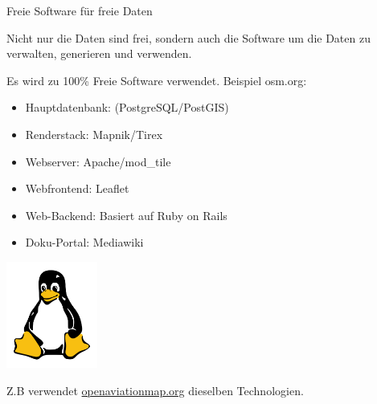 \documentclass[handout]{beamer}
\begin{document}

\begin{frame}{Freie Software für freie Daten}

Nicht nur die Daten sind frei, sondern auch die Software um die Daten zu verwalten, generieren und verwenden.

\vspace{0.6cm}

Es wird zu 100\% Freie Software verwendet. Beispiel osm.org:
\begin{itemize}
  \item Hauptdatenbank: (PostgreSQL/PostGIS) 
  \item Renderstack: Mapnik/Tirex
  \item Webserver: Apache/mod\_tile
  \item Webfrontend: Leaflet
  \item Web-Backend: Basiert auf Ruby on Rails
  \item Doku-Portal: Mediawiki
\end{itemize}


  \vspace*{-3cm}
 \hfill \includegraphics[width=3cm]{tux.png}


\pause

Z.B verwendet \href{http://openaviationmap.org/}{openaviationmap.org} dieselben Technologien.

\end{frame}
\end{document}
